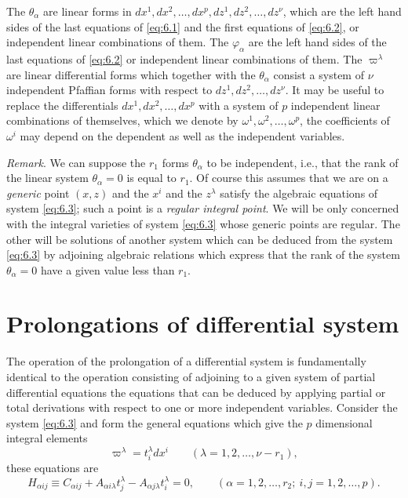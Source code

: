 \documentclass[leqno,11pt]{book}
\numberwithin{equation}{chapter}
\theoremstyle{shape1}
\theoremstyle{shape0}
\theoremstyle{shape2}
\theoremstyle{definition}
\begin{document}
The $\theta_{\alpha}$ are linear forms in $dx^{1},dx^{2},\dots,dx^{p},dz^{1},dz^{2},\dots,dz^{\nu}$, which are the left hand sides of the last equations of \eqref{eq:6.1} and the first equations of \eqref{eq:6.2}, or independent linear combinations of them. The $\varphi_{\alpha}$ are the left hand sides of the last equations of \eqref{eq:6.2} or independent linear combinations of them. The $\varpi^{\lambda}$ are  linear differential forms which together with the $\theta_{\alpha}$ consist a system of $\nu$ independent Pfaffian forms with respect to $dz^{1},dz^{2},\dots,dz^{\nu}$. It may be useful to replace the differentials $dx^{1},dx^{2},\dots,dx^{p}$ with a system of $p$ independent linear combinations of themselves, which we denote by $\omega^{1},\omega^{2},\dots,\omega^{p}$, the coefficients of $\omega^{i}$ may depend on the dependent as well as the independent variables.



\vspace{12pt}\fsec \emph{Remark}. We can suppose the $r_{1}$  forms $\theta_{\alpha}$ to be independent, i.e., that the rank of the linear system $\theta_{\alpha}=0$ is equal to $r_{1}$. Of course this assumes that we are on a \emph{generic} point $(x,z)$ and the $x^{i}$ and the $z^{\lambda}$ satisfy the algebraic equations of system \eqref{eq:6.3}; such a point is a \emph{regular integral point}. We will be only concerned with the integral varieties of system \eqref{eq:6.3} whose generic points are regular. The other will be solutions of another system which can be deduced from the system \eqref{eq:6.3} by adjoining algebraic relations which express that the rank of the system $\theta_{\alpha}=0$ have a given value less than $r_{1}$.


\section{Prolongations of differential system}
\label{sec:prol-diff-syst}

\fsec The operation of the prolongation of a differential system is fundamentally identical to the operation consisting of adjoining to a given system of partial differential equations the equations that can be deduced by applying partial or total derivations with respect to one or more independent variables. Consider the system \eqref{eq:6.3} and form the general equations which give the $p$ dimensional integral elements
\begin{equation}
  \label{eq:6.4}
  \varpi^{\lambda}=t_{i}^{\lambda}dx^{i}\qquad(\lambda=1,2,\dots,\nu-r_{1}),
\end{equation}
these equations are
\begin{equation}
  \label{eq:6.5}
  H_{\alpha ij}\equiv C_{\alpha ij}+A_{\alpha i\lambda}t_{j}^{\lambda}-A_{\alpha j\lambda}t_{i}^{\lambda}=0,\qquad(\alpha=1,2,\dots,r_{2};\ i,j=1,2,\dots,p).
\end{equation}
\end{document}
